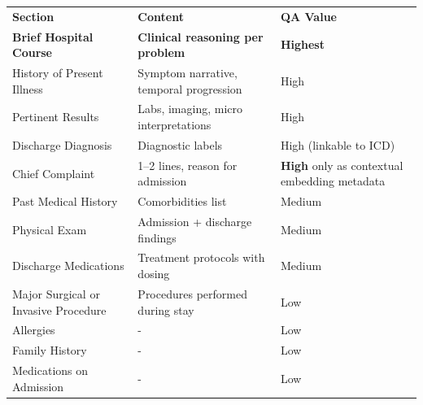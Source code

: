 \documentclass[11pt,a4paper]{article}
\newcommand{\blueText}[1]{\textcolor{betterblue}{#1}}
\newcommand{\mr}{\specialrule{0.4pt}{4pt}{4pt}}
\newcommand{\tr}{\specialrule{0.8pt}{4pt}{6pt}}
\begin{document}
\bigskip
\begin{center}
	\small
	\begin{tabular}{p{4cm} p{6.5cm}p{3.8cm}}
		\textbf{Section}                          & \textbf{Content}                                   & \textbf{QA Value}                                   \\
		\tr
		\blueText{\textbf{Brief Hospital Course}} & \blueText{\textbf{Clinical reasoning per problem}} & \blueText{\textbf{Highest}}                         \\
		History of Present Illness                & Symptom narrative, temporal progression            & High                                                \\
		Pertinent Results                         & Labs, imaging, micro interpretations               & High                                                \\
		Discharge Diagnosis                       & Diagnostic labels                                  & High (linkable to ICD)                              \\
		\mr
		Chief Complaint                           & 1--2 lines, reason for admission                   & \textbf{High} only as contextual embedding metadata \\
		Past Medical History                      & Comorbidities list                                 & Medium                                              \\
		Physical Exam                             & Admission + discharge findings                     & Medium                                              \\
		Discharge Medications                     & Treatment protocols with dosing                    & Medium                                              \\
		\mr
		Major Surgical or Invasive Procedure      & Procedures performed during stay                   & Low                                                 \\
		Allergies                                 & -                                                  & Low                                                 \\
		Family History                            & -                                                  & Low                                                 \\
		Medications on Admission                  & -                                                  & Low                                                 \\

\end{tabular}
\end{center}
\end{document}
